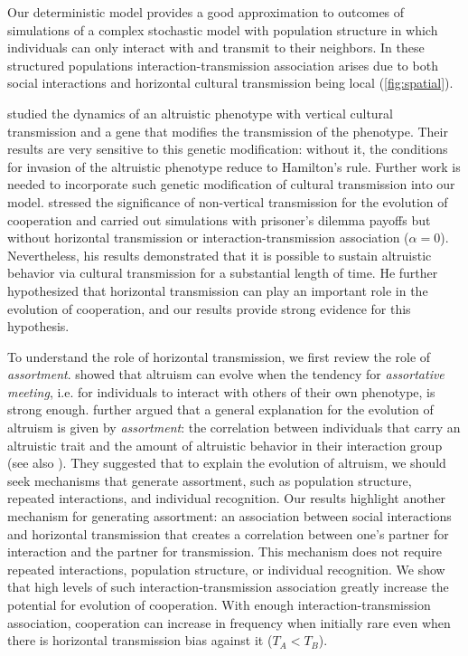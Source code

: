 \documentclass[12pt]{extarticle}
\begin{document}
Our deterministic model provides a good approximation to outcomes of simulations of a complex stochastic model with population structure in which individuals can only interact with and transmit to their neighbors.
In these structured populations interaction-transmission association arises due to both social interactions and horizontal cultural transmission being local (\autoref{fig:spatial}).

\citet{feldman1985gene} studied the dynamics of an altruistic phenotype with vertical cultural transmission and a gene that modifies the transmission of the phenotype. Their results are very sensitive to this genetic modification: without it, the conditions for invasion of the altruistic phenotype reduce to Hamilton's rule.
Further work is needed to incorporate such genetic modification of cultural transmission into our model.
\citet{woodcock2006significance} stressed the significance of non-vertical transmission for the evolution of cooperation and
carried out simulations with prisoner's dilemma payoffs but without horizontal transmission or interaction-transmission association ($\alpha=0$).
Nevertheless, his results demonstrated that it is possible to sustain altruistic behavior via cultural transmission for a substantial length of time.
He further hypothesized that horizontal transmission can play an important role in the evolution of cooperation, and our results provide strong evidence for this hypothesis. 

To understand the role of horizontal transmission, we first review the role of \emph{assortment}.
\citet{Eshel1982} showed that altruism can evolve when the tendency for \emph{assortative meeting}, i.e. for individuals to interact with others of their own phenotype, is strong enough.
\citet{Fletcher2009assortment}  further argued that a general explanation for the evolution of altruism is given by \emph{assortment}: the correlation between individuals that carry an altruistic trait and the amount of altruistic behavior in their interaction group (see also \citet{Bijma2010assortment}).
They suggested that to explain the evolution of altruism, we should seek mechanisms that generate  assortment, such as population structure, repeated interactions, and individual recognition.
Our results highlight another mechanism for generating assortment: an association between social interactions and horizontal transmission that creates a correlation between one's partner for interaction and the partner for transmission.
This mechanism does not require repeated interactions, population structure, or individual recognition.
We show that high levels of such interaction-transmission association greatly increase the potential for evolution of cooperation.
With enough interaction-transmission association, cooperation can increase in frequency when initially rare even when there is horizontal transmission bias against it ($T_A<T_B$).
\end{document}
